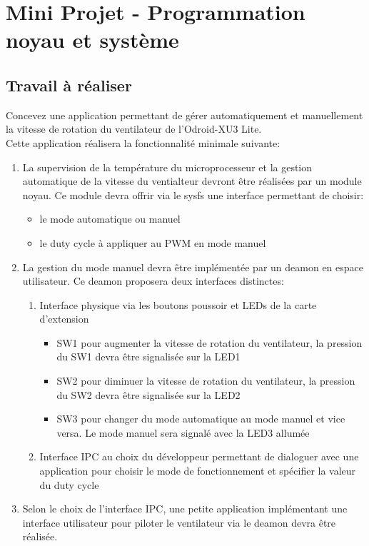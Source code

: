 \section{Mini Projet - Programmation noyau et système}
\subsection{Travail à réaliser}
Concevez une application permettant de gérer automatiquement et manuellement la vitesse de rotation du ventilateur de l'Odroid-XU3 Lite.\\
Cette application réalisera la fonctionnalité minimale suivante:
\begin{enumerate}
	\item La supervision de la température du microprocesseur et la gestion automatique de la vitesse du ventialteur devront être réalisées par un module noyau. Ce module devra offrir via le sysfs une interface permettant de choisir:
	\begin{itemize}
		\item le mode automatique ou manuel
		\item le duty cycle à appliquer au PWM en mode manuel
	\end{itemize}
	\item La gestion du mode manuel devra être implémentée par un deamon en espace utilisateur. Ce deamon proposera deux interfaces distinctes:
	\begin{enumerate}
		\item Interface physique via les boutons poussoir et LEDs de la carte d'extension
		\begin{itemize}
			\item SW1 pour augmenter la vitesse de rotation du ventilateur, la pression du SW1 devra être signalisée sur la LED1
			\item SW2 pour diminuer la vitesse de rotation du ventilateur, la pression du SW2 devra être signalisée sur la LED2
			\item SW3 pour changer du mode automatique au mode manuel et vice versa. Le mode manuel sera signalé avec la LED3 allumée
		\end{itemize}
		\item Interface IPC au choix du développeur permettant de dialoguer avec une application pour choisir le mode de fonctionnement et spécifier la valeur du duty cycle
	\end{enumerate}
	\item Selon le choix de l'interface IPC, une petite application implémentant une interface utilisateur pour piloter le ventilateur via le deamon devra être réalisée.
\end{enumerate}
